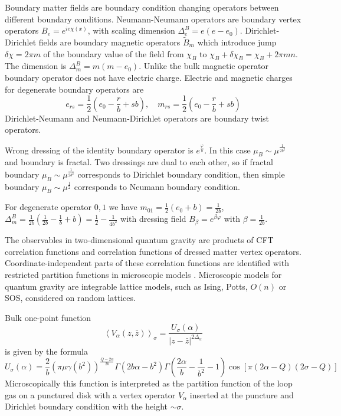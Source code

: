 \documentclass[12pt]{article}
\begin{document}
Boundary matter fields are boundary condition changing operators between different boundary
conditions. Neumann-Neumann operators are boundary vertex operators $B_{e}=e^{ie\chi(x)}$, with
scaling dimension $\Delta^{B}_{e}=e(e-e_{0})$. Dirichlet-Dirichlet fields are boundary magnetic
operators $\tilde B_{m}$ which introduce jump $\delta\chi=2\pi m$ of the boundary value of
the field from $\chi_{B}$ to $\chi_{B}+\delta\chi_{B}=\chi_{B}+2\pi m n$. The dimension is
$\Delta^{B}_{m}=m(m-e_{0})$. Unlike the bulk magnetic operator boundary operator does not have
electric charge. Electric and magnetic charges for degenerate boundary operators are
\begin{equation}
  \label{eq:143}
  e_{rs}=\frac{1}{2}\left( e_{0}-\frac{r}{b}+sb\right),\quad m_{rs}=\frac{1}{2}\left(e_{0}-\frac{r}{b}+sb\right)
\end{equation}
Dirichlet-Neumann and Neumann-Dirichlet operators are boundary twist operators. 

Wrong dressing of the identity boundary operator is $e^{\frac{\varphi}{b}}$. In this case
$\mu_{B}\sim \mu^{\frac{1}{2b^{2}}}$ and boundary is fractal. 
Two dressings are dual to each other, so if fractal boundary $\mu_{B}\sim \mu^{\frac{1}{2b^{2}}}$ corresponds to
Dirichlet boundary condition, then simple boundary $\mu_{B}\sim \mu^{\frac{1}{2}}$ corresponds to
Neumann boundary condition. 

For degenerate operator $0,1$ we have $m_{01}=\frac{1}{2}\left(e_{0}+b\right)=\frac{1}{2b}$,
$\Delta^{B}_{m}=\frac{1}{2b}\left(\frac{1}{2b}-\frac{1}{b}+b\right)=\frac{1}{2}-\frac{1}{4b^{2}}$
with dressing field $B_{\beta}=e^{\beta\varphi}$ with $\beta=\frac{1}{2b}$.

The observables in two-dimensional quantum gravity are products of CFT correlation functions and
correlation functions of dressed matter vertex operators. Coordinate-independent parts of these
correlation functions are identified with restricted partition functions in microscopic models
\cite{kostov2004boundary,kostov2003boundary}. Microscopic models for quantum gravity are integrable
lattice models, such as Ising, Potts, $O(n)$ or SOS, considered on random lattices.

Bulk one-point function
\begin{equation}
  \label{eq:179}
  \left< V_{\alpha}(z,\bar z)\right>_{\sigma}=\frac{U_{\sigma}(\alpha)}{|z-\bar z|^{2\Delta_{\alpha}}}
\end{equation}
is given by the formula
\begin{equation}
  \label{eq:180}
  U_{\sigma}(\alpha)=\frac{2}{b}\left(\pi\mu\gamma(b^{2})\right)^{\frac{Q-2\alpha}{2b}}
  \Gamma(2b\alpha-b^{2})\Gamma\left(\frac{2\alpha}{b}-\frac{1}{b^{2}}-1\right) \cos[\pi(2\alpha-Q)(2\sigma-Q)]
\end{equation}
Microscopically this function is interpreted as the partition function of the loop gas on a
punctured disk with a vertex operator $V_{\alpha}$ inserted at the puncture and Dirichlet boundary
condition with the height $\sim \sigma$. 
\end{document}
